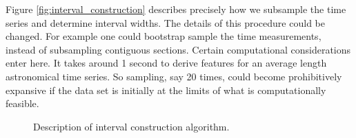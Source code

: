 \documentclass[10pt]{article}
\theoremstyle{definition}
\begin{document}
Figure \ref{fig:interval_construction} describes precisely how we subsample the time series and determine interval widths. The details of this procedure could be changed. For example one could bootstrap sample the time measurements, instead of subsampling contiguous sections. Certain computational considerations enter here. It takes around 1 second to derive features for an average length astronomical time series. So sampling, say 20 times, could become prohibitively expansive if the data set is initially at the limits of what is computationally feasible.
\begin{figure}[ht]
\begin{center}
{\small
{}
}
\end{center}
\caption{Description of interval construction algorithm.\label{fig:interval_construction}}
\label{lb}
\end{figure}

\end{document}
